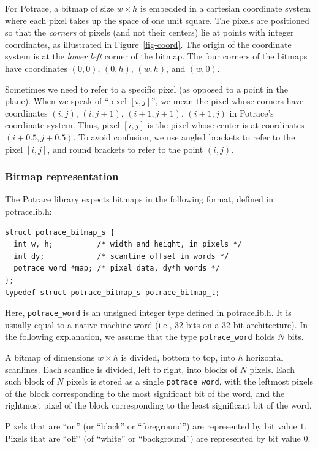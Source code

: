 \documentclass{article}
\begin{document}
For Potrace, a bitmap of size $w\times h$ is embedded in a cartesian
coordinate system where each pixel takes up the space of one unit
square. The pixels are positioned so that the {\em corners} of pixels
(and not their centers) lie at points with integer coordinates, as
illustrated in Figure~\ref{fig-coord}. The origin of the coordinate
system is at the {\em lower left} corner of the bitmap. The four
corners of the bitmaps have coordinates $(0,0)$, $(0,h)$, $(w,h)$, and
$(w,0)$.

Sometimes we need to refer to a specific pixel (as opposed to a point
in the plane). When we speak of ``pixel $[i,j]$'', we mean the pixel
whose corners have coordinates $(i,j)$, $(i,j+1)$, $(i+1,j+1)$,
$(i+1,j)$ in Potrace's coordinate system. Thus, pixel $[i,j]$ is the
pixel whose center is at coordinates $(i+0.5, j+0.5)$. To avoid
confusion, we use angled brackets to refer to the pixel $[i,j]$, and
round brackets to refer to the point $(i,j)$.

\subsubsection{Bitmap representation}

The Potrace library expects bitmaps in the following format, defined
in potracelib.h:

\begin{verbatim}
struct potrace_bitmap_s {
  int w, h;          /* width and height, in pixels */
  int dy;            /* scanline offset in words */
  potrace_word *map; /* pixel data, dy*h words */
};
typedef struct potrace_bitmap_s potrace_bitmap_t;
\end{verbatim}

Here, \verb!potrace_word! is an unsigned integer type defined in
potracelib.h. It is usually equal to a native machine word (i.e., 32
bits on a 32-bit architecture). In the following explanation, we
assume that the type \verb!potrace_word! holds $N$ bits.

A bitmap of dimensions $w\times h$ is divided, bottom to top, into $h$
horizontal scanlines. Each scanline is divided, left to right, into
blocks of $N$ pixels. Each such block of $N$ pixels is stored as a
single \verb!potrace_word!, with the leftmost pixels of the block
corresponding to the most significant bit of the word, and the
rightmost pixel of the block corresponding to the least significant
bit of the word.

Pixels that are ``on'' (or ``black'' or ``foreground'') are
represented by bit value $1$.  Pixels that are ``off'' (of ``white''
or ``background'') are represented by bit value $0$.
\end{document}

